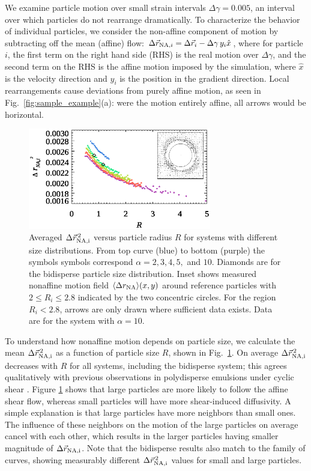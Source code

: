 \documentclass[%
 reprint,
 amsmath,amssymb,
 aps,
]{revtex4-2}
\begin{document}
We examine particle motion over small strain intervals $\Delta \gamma = 0.005$, an interval over which particles do not rearrange dramatically. To characterize the behavior of individual particles, we consider the non-affine component of motion by subtracting off the mean (affine) flow: $\Delta \vec{r}_{{\rm NA},i} = \Delta \vec{r}_{i} - \Delta \gamma \, y_{i}  \hat{x}$, where for particle $i$, the first term on the right hand side (RHS) is the real motion over $\Delta \gamma$, and the second term on the RHS is the affine motion imposed by the simulation, where $\hat{x}$ is the velocity direction and $y_{i}$ is the position in the gradient direction. Local rearrangements cause deviations from purely affine motion, as seen in Fig.~\ref{fig:sample_example}(a):  were the motion entirely affine, all arrows would be horizontal. 

\begin{figure}[ht]
    \centering
    \includegraphics[width=8cm]{ndr_r_alldata_080323.eps}
    \caption{Averaged $\Delta \vec{r}_{\rm NA,i}^{\,2}$ versus particle radius $R$ for systems with different size distributions.  From top curve (blue) to bottom (purple) the symbols symbols correspond $\alpha = 2, 3, 4, 5,$ and $10$. Diamonds are for the bidisperse particle size distribution. Inset shows measured nonaffine motion field $\langle \Delta r_{\rm NA} \rangle(x,y)$ around reference particles with $2 \leq R_i \leq 2.8$ indicated by the two concentric circles.  For the region $R_i < 2.8$, arrows are only drawn where sufficient data exists.  Data are for the system with $\alpha=10$.}
    \label{fig:ndr_radius}
    \vspace*{-12pt}
\end{figure}

To understand how nonaffine motion depends on particle size, we calculate the mean $\Delta \vec{r}_{\rm NA,i}^{\,2}$ as a function of particle size $R$, shown in Fig.~\ref{fig:ndr_radius}.  On average $\Delta \vec{r}_{\rm NA,i}^{\,2}$ decreases with $R$ for all systems, including the bidisperse system; this agrees qualitatively with previous observations in polydisperse emulsions under cyclic shear \cite{clararahola15}.  Figure \ref{fig:ndr_radius} shows that large particles are more likely to follow the affine shear flow, whereas small particles will have more shear-induced diffusivity. A simple explanation is that large particles have more neighbors than small ones. The influence of these neighbors on the motion of the large particles on average cancel with each other, which results in the larger particles having smaller magnitude of $\Delta \vec{r}_{\rm NA,i}$.  Note that the bidisperse results also match to the family of curves, showing measurably different $\Delta \vec{r}_{\rm NA,i}^{\,2}$ values for small and large particles.
\end{document}
